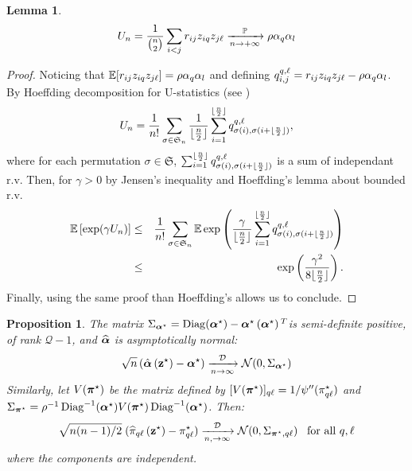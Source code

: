 \documentclass[]{imsart}
\newcommand{\1}{\mathds{1}}
\numberwithin{equation}{section}
\theoremstyle{plain}
\newtheorem{proposition}[thm]{Proposition}
\newtheorem{lemme}[thm]{Lemma}
\theoremstyle{remark}
\begin{document}
\begin{lemme}
$$U_{n} = \frac{1}{\binom{n}{2}}\sum_{i < j} r_{i j} z_{i q} z_{j\ell} \xrightarrow[n \to +\infty]{\mathbb{P}} \rho \alpha_{q}\alpha_{l}$$
\label{lem:convdenom}
\end{lemme}
\begin{proof}
Noticing that $\mathbb{E}[r_{i j} z_{i q} z_{j\ell}] = \rho \alpha_{q}\alpha_{l}$ and defining $q_{i,j}^{q, \ell}=r_{i j} z_{i q} z_{j\ell} - \rho \alpha_{q}\alpha_{l}$. By Hoeffding decomposition for U-statistics (see \cite{Hoeffding1963})
\begin{equation}
 \label{eq:ustat}
 U_{n} = \frac{1}{n!}\sum_{\sigma \in \mathfrak{S}_{n}}\frac{1}{\lfloor\frac{n}{2}\rfloor}\sum_{i=1}^{\lfloor\frac{n}{2}\rfloor}q_{\sigma(i), \sigma(i+\lfloor\frac{n}{2}\rfloor)}^{q, \el},
\end{equation}
where for each permutation $\sigma \in \mathfrak{S}$, $\sum_{i=1}^{\lfloor\frac{n}{2}\rfloor}q_{\sigma(i), \sigma(i+\lfloor\frac{n}{2}\rfloor)}^{q, \ell}$ is a sum of independant r.v. Then, for $\gamma > 0$ by Jensen's inequality and Hoeffding's lemma about bounded r.v.
\begin{eqnarray*}
\mathbb{E}\left[ \exp(\gamma U_{n}) \right] &\leq& \frac{1}{n!}\sum_{\sigma \in \mathfrak{S}_{n}}\mathbb{E}\exp\left(\frac{\gamma}{\lfloor\frac{n}{2}\rfloor}\sum_{i=1}^{\lfloor\frac{n}{2}\rfloor}q_{\sigma(i), \sigma(i+\lfloor\frac{n}{2}\rfloor)}^{q, \el}\right) \\
&\leq& \exp\left(\frac{\gamma^2}{8\lfloor\frac{n}{2}\rfloor}\right).
\end{eqnarray*}
Finally, using the same proof than Hoeffding's allows us to conclude.
\end{proof}



\begin{proposition}
  \label{prop:mle-asymptotic-normality}
  The matrix $\Sigma_{\boldsymbol{\alpha}^\star} = \operatorname{Diag}(\boldsymbol{\alpha}^\star) - \boldsymbol{\alpha}^\star\left(\boldsymbol{\alpha}^\star\right){^{T}} $is semi-definite positive, of rank $\mathcal{Q}-1$, and $\widehat{\boldsymbol{\alpha}}$ is asymptotically normal:
  \begin{equation}
    \label{eq:mle-proportion-asymptotic-normality}
    \sqrt{\n}\left( \hat{\bpi}\left(\bzs\right) - \bpis \right) \xrightarrow[\n \to \infty]{\mathcal{D}} \mathcal{N}(0, \Sigma_{\bpis})
  \end{equation}
Similarly, let $V(\boldsymbol{\pi}^\star)$ be the matrix defined by $[V(\boldsymbol{\pi}^\star)]_{q \ell} = 1/\psi''(\pi^\star_{q\ell})$ and\\  $\Sigma_{\boldsymbol{\pi}^\star} = \rho^{-1}\operatorname{Diag}^{-1}(\boldsymbol{\alpha}^\star) V(\boldsymbol{\pi}^\star) \operatorname{Diag}^{-1}(\boldsymbol{\alpha}^\star)$. Then:
  \begin{equation}
    \label{eq:mle-parameters-asymptotic-normality}
    \sqrt{\n(\n-1)/2}\;(\hal_{q\el}\left(\bzs\right) - \pi^\vrai_{q\el}) \xrightarrow[\n, \to \infty]{\mathcal{D}}  \mathcal{N}(0, \Sigma_{\bals, q \el})\;\;\; \hbox{for all  } q, \el
  \end{equation}
  where the components are independent. 
\end{proposition}
\end{document}
